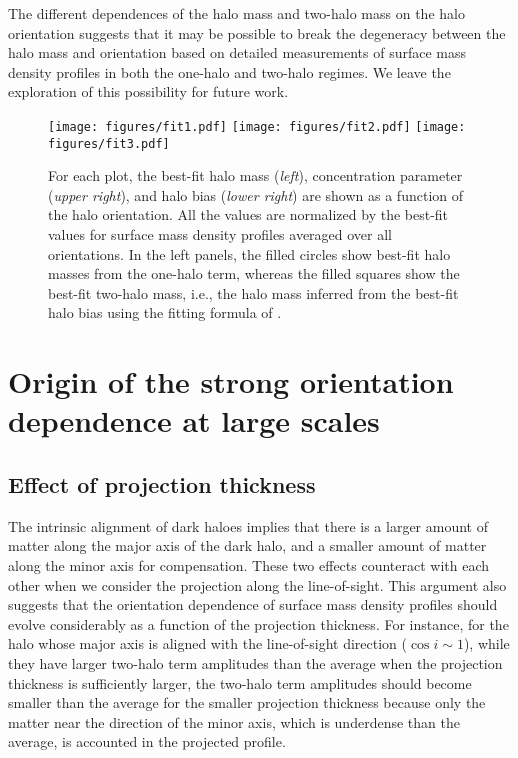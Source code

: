 \documentclass[a4paper,fleqn,usenatbib]{mnras}
\begin{document}
The different dependences of the halo mass and two-halo mass on the
halo orientation suggests that it may be possible to break the
degeneracy between the halo mass and orientation based on
detailed measurements of surface mass density profiles in both
the one-halo and two-halo regimes.
We leave the exploration of this possibility for future work.

\begin{figure}
\texttt{[image: figures/fit1.pdf]}
\texttt{[image: figures/fit2.pdf]}
\texttt{[image: figures/fit3.pdf]}
\caption{For each plot, the best-fit halo mass ({\it left}),
  concentration parameter ({\it upper right}), and halo bias
  ({\it lower right}) are shown as a function of the halo orientation.
  All the values are normalized by the best-fit values for surface mass
  density profiles averaged over all orientations.
  In the left panels, the filled circles show best-fit halo masses
  from the one-halo term, whereas the filled squares show
  the best-fit two-halo mass, i.e., the halo mass inferred from the
  best-fit halo bias using the fitting formula of \citet{Tinker2010}.}
\label{fig:fit}
\end{figure}

\section{Origin of the strong orientation dependence at large scales}
\label{sec:origin}

\subsection{Effect of projection thickness}
The intrinsic alignment of dark haloes implies that there is a larger
amount of matter along the major axis of the dark halo, and a smaller
amount of matter along the minor axis for compensation. These two
effects counteract with each other when we consider the projection
along the line-of-sight. This argument also suggests that the
orientation dependence of surface mass density profiles should evolve
considerably as a function of the projection thickness. For instance,
for the halo whose major axis is aligned with the line-of-sight
direction ($\cos i \sim 1$), while they have larger two-halo term
amplitudes than the average when the projection thickness is
sufficiently larger, the two-halo term amplitudes should become
smaller than the average for the smaller projection thickness
because only the matter near the direction of the minor axis,
which is underdense than the average,
is accounted in the projected profile.
\end{document}
